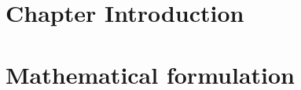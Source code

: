 \section{Chapter Introduction}
\label{ch:wave_scattering:sec:intro}


\section{Mathematical formulation}
\label{ch:wave_scattering:sec:math}
